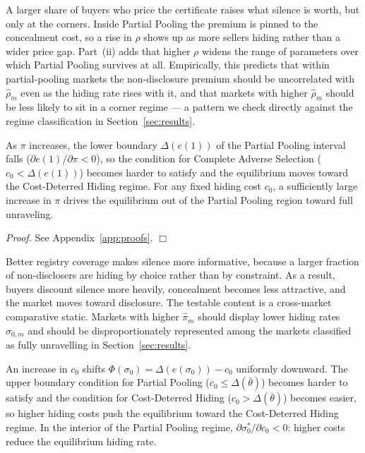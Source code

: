 \noindent A larger share of buyers who price the certificate raises what silence is worth, but
only at the corners. Inside Partial Pooling the premium is pinned to the concealment cost, so a
rise in $\rho$ shows up as more sellers hiding rather than a wider price gap. Part~(ii) adds that
higher $\rho$ widens the range of parameters over which Partial Pooling survives at all.
Empirically, this predicts that within partial-pooling markets the non-disclosure premium should
be uncorrelated with $\hat\rho_m$ even as the hiding rate rises with it, and that markets with
higher $\hat\rho_m$ should be less likely to sit in a corner regime --- a pattern we check
directly against the regime classification in Section~\ref{sec:results}.


\begin{proposition}
\label{prop:pi}
As $\pi$ increases, the lower boundary $\Delta(e(1))$ of the Partial Pooling interval falls ($\partial e(1)/\partial\pi < 0$), so the condition for Complete Adverse Selection ($c_0 < \Delta(e(1))$) becomes harder to satisfy and the equilibrium moves toward the Cost-Deterred Hiding regime. For any fixed hiding cost $c_0$, a sufficiently large increase in $\pi$ drives the equilibrium out of the Partial Pooling region toward full unraveling.
\end{proposition}

\noindent\textit{Proof.} See Appendix~\ref{app:proofs}. $\Box$

\noindent Better registry coverage makes silence more informative, because a larger
fraction of non-disclosers are hiding by choice rather than by constraint. As a result, buyers
discount silence more heavily, concealment becomes less attractive, and the market moves toward
disclosure. The testable content is a cross-market comparative static. Markets with higher
$\hat\pi_m$ should display lower hiding rates $\hat\sigma_{0,m}$ and should be
disproportionately represented among the markets classified as fully unravelling in
Section~\ref{sec:results}.


\begin{proposition}
\label{prop:c0}
An increase in $c_0$ shifts $\Phi(\sigma_0) = \Delta(e(\sigma_0)) - c_0$ uniformly downward. The upper boundary condition for Partial Pooling ($c_0 \leq \Delta(\bar{\theta})$) becomes harder to satisfy and the condition for Cost-Deterred Hiding ($c_0 > \Delta(\bar{\theta})$) becomes easier, so higher hiding costs push the equilibrium toward the Cost-Deterred Hiding regime. In the interior of the Partial Pooling regime, $\partial\sigma_0^*/\partial c_0 < 0$: higher costs reduce the equilibrium hiding rate.
\end{proposition}

